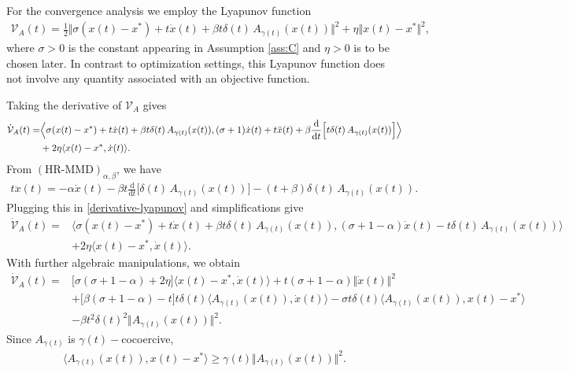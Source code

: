 \documentclass[11pt]{article}
\numberwithin{equation}{section}
\begin{document}
For the convergence analysis we employ the Lyapunov function 
\begin{align*}
    \mathcal{V}_{A}(t)=\frac{1}{2}\Big\Vert \sigma(x(t)-x^*)+t\dot{x}(t)+\beta t\delta(t)\,A_{\gamma(t)}(x(t)) \Big\Vert^2 +\eta\Vert x(t)-x^*\Vert^2, 
\end{align*}
where $\sigma>0$ is the constant appearing in Assumption \ref{ass:C} and $\eta>0$ is to be chosen later.
In contrast to optimization settings, this Lyapunov function does not involve any quantity associated with an objective function. 

Taking the derivative of $\mathcal{V}_A$ gives 
\begin{align}
\label{derivative-lyapunov}
    \dot{\mathcal{V}}_{A}(t)=&\Big \langle \sigma(x(t)-x^*)+t\dot{x}(t)+\beta t\delta(t)\,A_{\gamma(t)}(x(t)), (\sigma+1)\dot{x}(t)+t\ddot{x}(t)+\beta\frac{\mathrm{d}}{\mathrm{d}t}\Big[t\delta(t)\,A_{\gamma(t)}(x(t))\Big] \Big\rangle \notag\\
    &+2\eta\langle x(t)-x^*,\dot{x}(t) \rangle. 
\end{align}
From $(\text{HR-MMD})_{\alpha,\beta}$, we have 
\begin{align*}
    t\ddot{x}(t)=-\alpha\dot{x}(t)-\beta t\frac{\mathrm{d}}{\mathrm{d}t}\Big[\delta(t)\,A_{\gamma(t)}(x(t))\Big]-(t+\beta)\delta(t)\,A_{\gamma(t)}(x(t)).
\end{align*}
Plugging this in \eqref{derivative-lyapunov} and simplifications give
\begin{align*}
\dot{\mathcal{V}}_{A}(t)=&\Big \langle \sigma(x(t)-x^*)+t\dot{x}(t)+\beta t\delta(t)\,A_{\gamma(t)}(x(t)), (\sigma+1-\alpha)\dot{x}(t)-t\delta(t)\,A_{\gamma(t)}(x(t)) \Big\rangle \\
    &+2\eta\langle x(t)-x^*,\dot{x}(t) \rangle. 
\end{align*}
With further algebraic manipulations, we obtain 
\begin{align*}
    \dot{\mathcal{V}}_{A}(t)=&\Big[\sigma(\sigma+1-\alpha)+2\eta\Big]\langle x(t)-x^*,\dot{x}(t) \rangle +t(\sigma+1-\alpha)\Vert \dot{x}(t) \Vert^2 \\
    &+\Big[\beta(\sigma+1-\alpha)-t\Big]t\delta(t)\Big\langle A_{\gamma(t)}(x(t)),\dot{x}(t) \Big\rangle -\sigma t\delta(t) \Big \langle A_{\gamma(t)}(x(t)),x(t)-x^{*} \Big \rangle \\
    &-\beta t^2\delta(t)^2\Big\Vert A_{\gamma(t)}(x(t)) \Big \Vert^2.
\end{align*}
Since $A_{\gamma(t)}$ is $\gamma(t)-$cocoercive, 
\begin{align*}
\Big \langle A_{\gamma(t)}(x(t)),x(t)-x^{*} \Big \rangle \geq \gamma(t) \Big \Vert A_{\gamma(t)}(x(t)) \Big \Vert^2. 
\end{align*}
\end{document}
